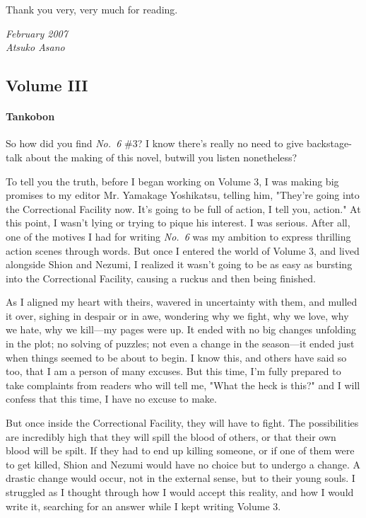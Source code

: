 Thank you very, very much for reading.

\myspace

\emph{February 2007\\
Atsuko Asano}

\clearpage
\subsection{Volume III}
\paragraph{Tankobon}

So how did you find \emph{No.~6} \#3? I know there's really no need to give
backstage-talk about the making of this novel, but\el will you listen
nonetheless?

To tell you the truth, before I began working on Volume 3, I was making
big promises to my editor Mr. Yamakage Yoshikatsu, telling him, "They're
going into the Correctional Facility now. It's going to be full of
action, I tell you, action." At this point, I wasn't lying or trying to
pique his interest. I was serious. After all, one of the motives I had
for writing \emph{No.~6} was my ambition to express thrilling action scenes
through words. But once I entered the world of Volume 3, and lived
alongside Shion and Nezumi, I realized it wasn't going to be as easy as
bursting into the Correctional Facility, causing a ruckus and then being
finished.

As I aligned my heart with theirs, wavered in uncertainty with them, and
mulled it over, sighing in despair or in awe, wondering why we fight,
why we love, why we hate, why we kill---my pages were up. It ended with no
big changes unfolding in the plot; no solving of puzzles; not even a
change in the season---it ended just when things seemed to be about to
begin. I know this, and others have said so too, that I am a person of
many excuses. But this time, I'm fully prepared to take complaints from
readers who will tell me, "What the heck is this?" and I will confess
that this time, I have no excuse to make.

But once inside the Correctional Facility, they will have to fight. The
possibilities are incredibly high that they will spill the blood of
others, or that their own blood will be spilt. If they had to end up
killing someone, or if one of them were to get killed, Shion and Nezumi
would have no choice but to undergo a change. A drastic change would
occur, not in the external sense, but to their young souls. I struggled
as I thought through how I would accept this reality, and how I would
write it, searching for an answer while I kept writing Volume 3.

